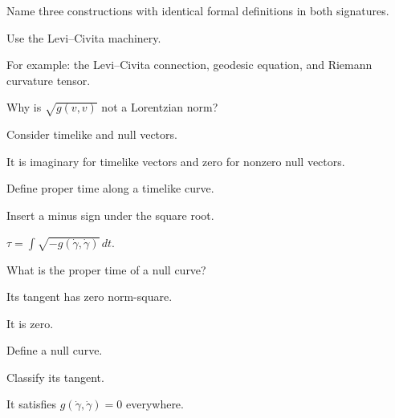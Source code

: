 \begin{exercise}\label{exr:vii30-02}
Name three constructions with identical formal definitions in both signatures.
\end{exercise}
\begin{hint}
Use the Levi--Civita machinery.
\end{hint}
\begin{solution}
For example: the Levi--Civita connection, geodesic equation, and Riemann curvature tensor.
\end{solution}

\begin{exercise}\label{exr:vii30-03}
Why is \(\sqrt{g(v,v)}\) not a Lorentzian norm?
\end{exercise}
\begin{hint}
Consider timelike and null vectors.
\end{hint}
\begin{solution}
It is imaginary for timelike vectors and zero for nonzero null vectors.
\end{solution}

\begin{exercise}\label{exr:vii30-04}
Define proper time along a timelike curve.
\end{exercise}
\begin{hint}
Insert a minus sign under the square root.
\end{hint}
\begin{solution}
\(\tau=\int\sqrt{-g(\dot\gamma,\dot\gamma)}\,dt\).
\end{solution}

\begin{exercise}\label{exr:vii30-05}
What is the proper time of a null curve?
\end{exercise}
\begin{hint}
Its tangent has zero norm-square.
\end{hint}
\begin{solution}
It is zero.
\end{solution}

\begin{exercise}\label{exr:vii30-06}
Define a null curve.
\end{exercise}
\begin{hint}
Classify its tangent.
\end{hint}
\begin{solution}
It satisfies \(g(\dot\gamma,\dot\gamma)=0\) everywhere.
\end{solution}

